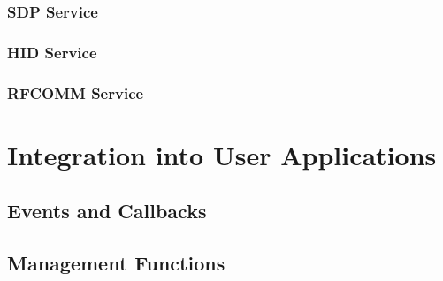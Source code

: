 \FloatBarrier
\subsubsection{SDP Service}


\FloatBarrier
\subsubsection{HID Service}


\FloatBarrier
\subsubsection{RFCOMM Service}


\section{Integration into User Applications}


\FloatBarrier
\subsection{Events and Callbacks}


\FloatBarrier
\subsection{Management Functions}

